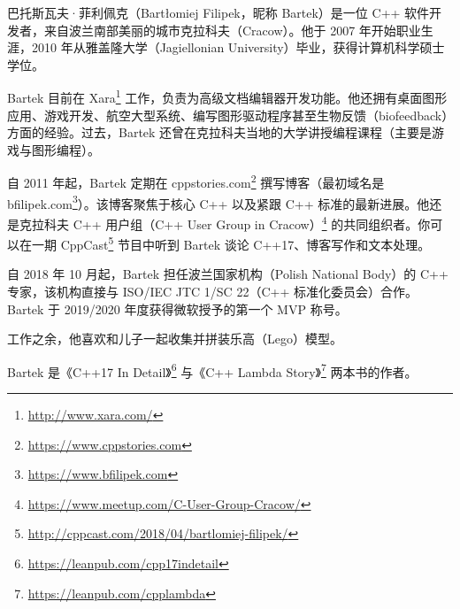 巴托斯瓦夫·菲利佩克（Bartłomiej Filipek，昵称 Bartek）是一位 C++ 软件开发者，来自波兰南部美丽的城市克拉科夫（Cracow）。他于 2007 年开始职业生涯，2010 年从雅盖隆大学（Jagiellonian University）毕业，获得计算机科学硕士学位。

Bartek 目前在 Xara\footnote{\url{http://www.xara.com/}} 工作，负责为高级文档编辑器开发功能。他还拥有桌面图形应用、游戏开发、航空大型系统、编写图形驱动程序甚至生物反馈（biofeedback）方面的经验。过去，Bartek 还曾在克拉科夫当地的大学讲授编程课程（主要是游戏与图形编程）。

自 2011 年起，Bartek 定期在 cppstories.com\footnote{\url{https://www.cppstories.com}} 撰写博客（最初域名是 bfilipek.com\footnote{\url{https://www.bfilipek.com}}）。该博客聚焦于核心 C++ 以及紧跟 C++ 标准的最新进展。他还是克拉科夫 C++ 用户组（C++ User Group in Cracow）\footnote{\url{https://www.meetup.com/C-User-Group-Cracow/}} 的共同组织者。你可以在一期 CppCast\footnote{\url{http://cppcast.com/2018/04/bartlomiej-filipek/}} 节目中听到 Bartek 谈论 C++17、博客写作和文本处理。

自 2018 年 10 月起，Bartek 担任波兰国家机构（Polish National Body）的 C++ 专家，该机构直接与 ISO/IEC JTC 1/SC 22（C++ 标准化委员会）合作。Bartek 于 2019/2020 年度获得微软授予的第一个 MVP 称号。

工作之余，他喜欢和儿子一起收集并拼装乐高（Lego）模型。

Bartek 是《C++17 In Detail》\footnote{\url{https://leanpub.com/cpp17indetail}} 与《C++ Lambda Story》\footnote{\url{https://leanpub.com/cpplambda}} 两本书的作者。
